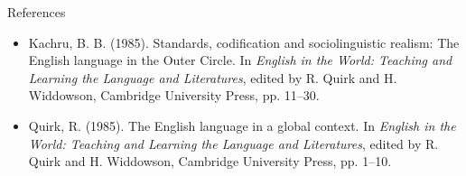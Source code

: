 \documentclass{beamer}
\begin{document}
\begin{frame}{References}
\begin{itemize}
    \item Kachru, B. B. (1985). Standards, codification and sociolinguistic realism: The English language in the Outer Circle. In \textit{English in the World: Teaching and Learning the Language and Literatures}, edited by R. Quirk and H. Widdowson, Cambridge University Press, pp. 11–30.
    \item Quirk, R. (1985). The English language in a global context. In \textit{English in the World: Teaching and Learning the Language and Literatures}, edited by R. Quirk and H. Widdowson, Cambridge University Press, pp. 1–10.
\end{itemize}
\end{frame}
\end{document}
